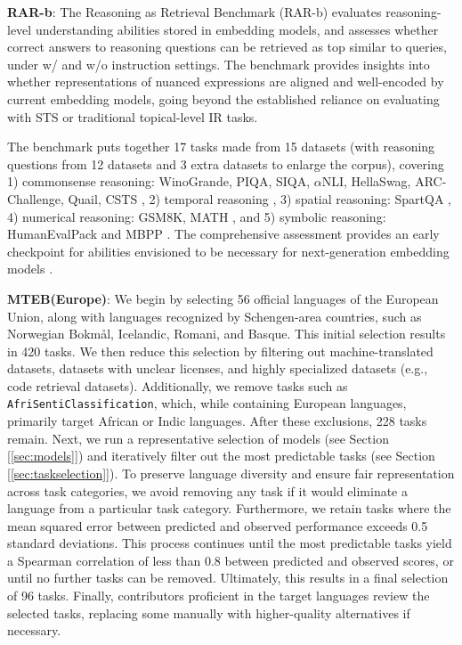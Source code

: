 \textbf{RAR-b}: The Reasoning as Retrieval Benchmark (RAR-b) \citep{xiao2024rar} evaluates reasoning-level understanding abilities stored in embedding models, and assesses whether correct answers to reasoning questions can be retrieved as top similar to queries, under w/ and w/o instruction settings. The benchmark provides insights into whether representations of nuanced expressions are aligned and well-encoded by current embedding models, going beyond the established reliance on evaluating with STS or traditional topical-level IR tasks.

The benchmark puts together 17 tasks made from 15 datasets (with reasoning questions from 12 datasets and 3 extra datasets to enlarge the corpus), covering 1) commonsense reasoning: WinoGrande, PIQA, SIQA, $\alpha$NLI, HellaSwag, ARC-Challenge, Quail, CSTS \citep{sakaguchi2021winogrande,bisk2020piqa,sap2019social,bhagavatula2019abductive,zellers2019hellaswag,clark2018think,rogers2020getting,deshpande2023csts}, 2) temporal reasoning \citep{tan2023towards}, 3) spatial reasoning: SpartQA \citep{mirzaee2021spartqa}, 4) numerical reasoning: GSM8K, MATH \citep{hendrycks2021measuring,cobbe2021training,yu2023metamath}, and 5) symbolic reasoning: HumanEvalPack and MBPP \citep{husain2019codesearchnet,austin2021program,chen2021evaluating,muennighoff2023octopack}. The comprehensive assessment provides an early checkpoint for abilities envisioned to be necessary for next-generation embedding models \citep{xiao2024rar}. 

\textbf{MTEB(Europe)}:
We begin by selecting 56 official languages of the European Union, along with languages recognized by Schengen-area countries, such as Norwegian Bokmål, Icelandic, Romani, and Basque. This initial selection results in 420 tasks. We then reduce this selection by filtering out machine-translated datasets, datasets with unclear licenses, and highly specialized datasets (e.g., code retrieval datasets). Additionally, we remove tasks such as \texttt{AfriSentiClassification}, which, while containing European languages, primarily target African or Indic languages. After these exclusions, 228 tasks remain.
Next, we run a representative selection of models (see Section [\ref{sec:models}]) and iteratively filter out the most predictable tasks (see Section [\ref{sec:taskselection}]).
To preserve language diversity and ensure fair representation across task categories, we avoid removing any task if it would eliminate a language from a particular task category. Furthermore, we retain tasks where the mean squared error between predicted and observed performance exceeds 0.5 standard deviations. This process continues until the most predictable tasks yield a Spearman correlation of less than 0.8 between predicted and observed scores, or until no further tasks can be removed. Ultimately, this results in a final selection of 96 tasks. Finally, contributors proficient in the target languages review the selected tasks, replacing some manually with higher-quality alternatives if necessary.


